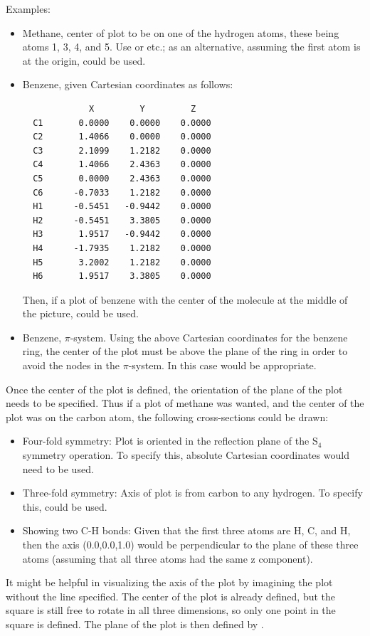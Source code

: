 Examples:
\begin{itemize}
\item Methane, center of plot to be on one of the hydrogen atoms, these
being atoms 1, 3, 4, and 5. Use  or  etc.; as an
alternative, assuming the first atom is at the origin,
 could be used.
\item Benzene, given Cartesian coordinates as follows:
\begin{verbatim}
             X         Y         Z
  C1       0.0000    0.0000    0.0000
  C2       1.4066    0.0000    0.0000
  C3       2.1099    1.2182    0.0000
  C4       1.4066    2.4363    0.0000
  C5       0.0000    2.4363    0.0000
  C6      -0.7033    1.2182    0.0000
  H1      -0.5451   -0.9442    0.0000
  H2      -0.5451    3.3805    0.0000
  H3       1.9517   -0.9442    0.0000
  H4      -1.7935    1.2182    0.0000
  H5       3.2002    1.2182    0.0000
  H6       1.9517    3.3805    0.0000
\end{verbatim}
Then, if a plot of benzene with the center of the molecule at the middle
of the picture,  could be used.
\item Benzene, $\pi$-system. Using the above Cartesian coordinates for the
benzene ring, the center of the plot must be above the plane of the
ring in order to avoid the nodes in the $\pi$-system. In this case
 would be appropriate.
\end{itemize}
 Once the center of the plot is defined, the orientation of the plane
of the plot needs to be specified. Thus if a plot of methane was wanted,
and the center of the plot was on the carbon atom, the following
cross-sections could be drawn:
\begin{itemize}
\item Four-fold symmetry: Plot is oriented in the reflection plane of the
S$_4$ symmetry operation. To specify this, absolute Cartesian
coordinates would need to be used.
\item Three-fold symmetry: Axis of plot is from carbon to any hydrogen.
To specify this,  could be used.
\item Showing two C-H bonds: Given that the first three atoms are H, C, and
H, then the axis (0.0,0.0,1.0) would be perpendicular to the plane
of  these three atoms (assuming that all three atoms had the same z component).
\end{itemize}
 It might be helpful in visualizing the axis of the plot by imagining the plot
without the line specified. The center of the plot is already defined, but
the square is still free to rotate in all three dimensions, so only one
point in the square is defined. The plane of the plot is then
defined by .

